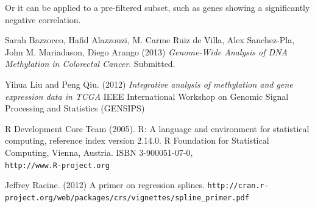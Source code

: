 \documentclass[a4paper,10pt]{article}\usepackage[]{graphicx}\usepackage[]{color}
\begin{document}
Or it can be applied to a pre-filtered subset, such as genes showing a significantly negative correlation.


\clearpage
\begin{thebibliography}{9}


 Sarah Bazzocco, Hafid Alazzouzi, M. Carme Ruiz de Villa, Alex Sanchez-Pla, John M. Mariadason, Diego Arango (2013) \emph{Genome-Wide Analysis of DNA Methylation in Colorectal Cancer}. Submitted.

 Yihua Liu and Peng Qiu. (2012) \emph{Integrative analysis of methylation and gene expression data in TCGA} IEEE International Workshop on Genomic Signal Processing and Statistics (GENSIPS)

 R Development Core Team (2005). R: A language and environment for statistical computing,  reference index version 2.14.0. R Foundation for Statistical Computing, Vienna, Austria. ISBN 3-900051-07-0, \\
  \verb|http://www.R-project.org|

 Jeffrey Racine. (2012) A primer on regression splines.\newline
\verb|http://cran.r-project.org/web/packages/crs/vignettes/spline_primer.pdf|

\end{thebibliography}
\end{document}
